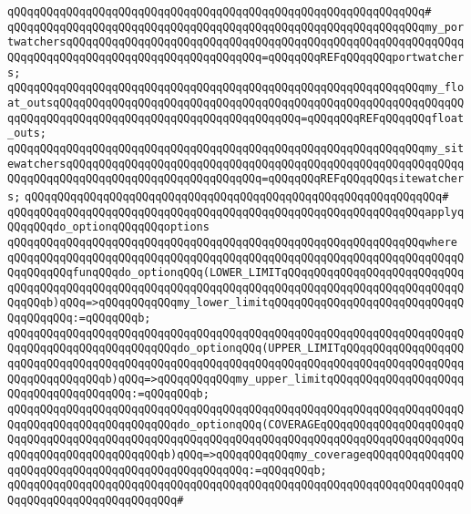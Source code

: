 \verb|qQQqqQQqqQQqqQQqqQQqqQQqqQQqqQQqqQQqqQQqqQQqqQQqqQQqqQQqqQQqqQQq#|\newline
\verb|qQQqqQQqqQQqqQQqqQQqqQQqqQQqqQQqqQQqqQQqqQQqqQQqqQQqqQQqqQQqqQQqmy_portwatchersqQQqqQQqqQQqqQQqqQQqqQQqqQQqqQQqqQQqqQQqqQQqqQQqqQQqqQQqqQQqqQQqqQQqqQQqqQQqqQQqqQQqqQQqqQQqqQQqqQQq=qQQqqQQqREFqQQqqQQqportwatchers;|\newline
\verb|qQQqqQQqqQQqqQQqqQQqqQQqqQQqqQQqqQQqqQQqqQQqqQQqqQQqqQQqqQQqqQQqmy_float_outsqQQqqQQqqQQqqQQqqQQqqQQqqQQqqQQqqQQqqQQqqQQqqQQqqQQqqQQqqQQqqQQqqQQqqQQqqQQqqQQqqQQqqQQqqQQqqQQqqQQqqQQqqQQq=qQQqqQQqREFqQQqqQQqfloat_outs;|\newline
\verb|qQQqqQQqqQQqqQQqqQQqqQQqqQQqqQQqqQQqqQQqqQQqqQQqqQQqqQQqqQQqqQQqmy_sitewatchersqQQqqQQqqQQqqQQqqQQqqQQqqQQqqQQqqQQqqQQqqQQqqQQqqQQqqQQqqQQqqQQqqQQqqQQqqQQqqQQqqQQqqQQqqQQqqQQqqQQq=qQQqqQQqREFqQQqqQQqsitewatchers;|\newline
\verb|qQQqqQQqqQQqqQQqqQQqqQQqqQQqqQQqqQQqqQQqqQQqqQQqqQQqqQQqqQQqqQQq#|\newline
\newline
\verb|qQQqqQQqqQQqqQQqqQQqqQQqqQQqqQQqqQQqqQQqqQQqqQQqqQQqqQQqqQQqqQQqapplyqQQqqQQqdo_optionqQQqqQQqoptions|\newline
\verb|qQQqqQQqqQQqqQQqqQQqqQQqqQQqqQQqqQQqqQQqqQQqqQQqqQQqqQQqqQQqqQQqwhere|\newline
\verb|qQQqqQQqqQQqqQQqqQQqqQQqqQQqqQQqqQQqqQQqqQQqqQQqqQQqqQQqqQQqqQQqqQQqqQQqqQQqqQQqfunqQQqdo_optionqQQq(LOWER_LIMITqQQqqQQqqQQqqQQqqQQqqQQqqQQqqQQqqQQqqQQqqQQqqQQqqQQqqQQqqQQqqQQqqQQqqQQqqQQqqQQqqQQqqQQqqQQqqQQqqQQqqQQqb)qQQq=>qQQqqQQqqQQqmy_lower_limitqQQqqQQqqQQqqQQqqQQqqQQqqQQqqQQqqQQqqQQq:=qQQqqQQqb;|\newline
\verb|qQQqqQQqqQQqqQQqqQQqqQQqqQQqqQQqqQQqqQQqqQQqqQQqqQQqqQQqqQQqqQQqqQQqqQQqqQQqqQQqqQQqqQQqqQQqqQQqdo_optionqQQq(UPPER_LIMITqQQqqQQqqQQqqQQqqQQqqQQqqQQqqQQqqQQqqQQqqQQqqQQqqQQqqQQqqQQqqQQqqQQqqQQqqQQqqQQqqQQqqQQqqQQqqQQqqQQqqQQqb)qQQq=>qQQqqQQqqQQqmy_upper_limitqQQqqQQqqQQqqQQqqQQqqQQqqQQqqQQqqQQqqQQq:=qQQqqQQqb;|\newline
\verb|qQQqqQQqqQQqqQQqqQQqqQQqqQQqqQQqqQQqqQQqqQQqqQQqqQQqqQQqqQQqqQQqqQQqqQQqqQQqqQQqqQQqqQQqqQQqqQQqdo_optionqQQq(COVERAGEqQQqqQQqqQQqqQQqqQQqqQQqqQQqqQQqqQQqqQQqqQQqqQQqqQQqqQQqqQQqqQQqqQQqqQQqqQQqqQQqqQQqqQQqqQQqqQQqqQQqqQQqqQQqqQQqqQQqb)qQQq=>qQQqqQQqqQQqmy_coverageqQQqqQQqqQQqqQQqqQQqqQQqqQQqqQQqqQQqqQQqqQQqqQQqqQQq:=qQQqqQQqb;|\newline
\verb|qQQqqQQqqQQqqQQqqQQqqQQqqQQqqQQqqQQqqQQqqQQqqQQqqQQqqQQqqQQqqQQqqQQqqQQqqQQqqQQqqQQqqQQqqQQqqQQq#|\newline
